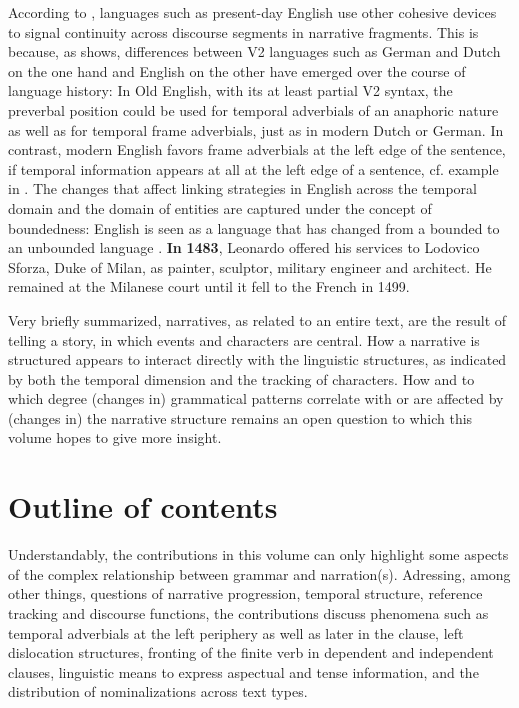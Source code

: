 \documentclass[output=paper,colorlinks,citecolor=brown]{langscibook}
\begin{document}
\noindent
According to \citet{vonStutt2005subjektwahl}, languages such as present-day English use other cohesive devices to signal continuity across discourse segments in narrative fragments. This is because, as \citet{los2012} shows, differences between V2 languages such as German and Dutch on the one hand and English on the other have emerged over the course of language history: In Old English, with its at least partial V2 syntax, the preverbal position could be used for temporal adverbials of an anaphoric nature as well as for temporal frame adverbials, just as in modern Dutch or German. In contrast, modern English favors frame adverbials at the left edge of the sentence, if temporal information appears at all at the left edge of a sentence, cf.  example in . The changes that affect linking strategies in English across the temporal domain and the domain of entities are captured under the concept of boundedness: English is seen as a language that has changed from a bounded to an unbounded language \citep{los2012}.
\ea \label{ex:Virtanen}
\textbf{In} \textbf{1483}, Leonardo offered his services to Lodovico Sforza, Duke of Milan, as painter, sculptor, military engineer and architect. He remained at the Milanese court until it fell to the French in 1499.
\z

\noindent
Very briefly summarized, narratives, as related to an entire text, are the result of telling a story, in which events and characters are central. How a narrative is structured appears to interact directly with the linguistic structures, as indicated by both the temporal dimension and the tracking of characters. How and to which degree (changes in) grammatical patterns correlate with or are affected by (changes in) the narrative structure remains an open question to which this volume hopes to give more insight.

\section{Outline of contents}
Understandably, the contributions in this volume can only highlight some aspects of the complex relationship between grammar and narration(s). Adressing, among other things, questions of narrative progression, temporal structure, reference tracking and discourse functions, the contributions discuss phenomena such as temporal adverbials at the left periphery as well as later in the clause, left dislocation structures, fronting of the finite verb in dependent and independent clauses, linguistic means to express aspectual and tense information, and the distribution of nominalizations across text types.
\end{document}
